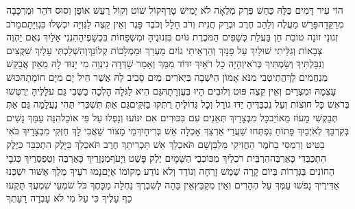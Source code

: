 \documentclass[../main/main.tex]{subfiles}
\begin{document}
\begin{multicols*}{\ncols}
הוֹי עִיר דָּמִים כֻּלָּהּ כַּחַשׁ פֶּרֶק מְלֵאָה לֹא יָמִישׁ טָרֶף\PreVerseSpace{}קוֹל שׁוֹט וְקוֹל רַעַשׁ אוֹפָן וְסוּס דֹּהֵר וּמֶרְכָּבָה מְרַקֵּדָה\PreVerseSpace{}פָּרָשׁ מַעֲלֶה וְלַהַב חֶרֶב וּבְרַק חֲנִית וְרֹב חָלָל וְכֹבֶד פָּגֶר וְאֵין קֵצֶה לַגְּוִיָּה יִכְשְׁלוּ בִּגְוִיָּתָם\PreVerseSpace{}מֵרֹב זְנוּנֵי זוֹנָה טוֹבַת חֵן בַּעֲלַת כְּשָׁפִים הַמֹּכֶרֶת גּוֹיִם בִּזְנוּנֶיהָ וּמִשְׁפָּחוֹת בִּכְשָׁפֶיהָ\PreVerseSpace{}הִנְנִי אֵלַיִךְ נְאֻם יַהְוֶה צְבָאוֹת וְגִלֵּיתִי שׁוּלַיִךְ עַל פָּנָיִךְ וְהַרְאֵיתִי גוֹיִם מַעְרֵךְ וּמַמְלָכוֹת קְלוֹנֵךְ\PreVerseSpace{}וְהִשְׁלַכְתִּי עָלַיִךְ שִׁקֻּצִים וְנִבַּלְתִּיךְ וְשַׂמְתִּיךְ כְּרֹאִי\PreVerseSpace{}וְהָיָה כָל רֹאַיִךְ יִדּוֹד מִמֵּךְ וְאָמַר שָׁדְּדָה נִינְוֵה מִי יָנוּד לָהּ מֵאַיִן אֲבַקֵּשׁ מְנַחֲמִים לָךְ\PreVerseSpace{}הֲתֵיטְבִי מִנֹּא אָמוֹן הַיֹּשְׁבָה בַּיְאֹרִים מַיִם סָבִיב לָהּ אֲשֶׁר חֵיל יָם מִיָּם חוֹמָתָהּ\PreVerseSpace{}כּוּשׁ עָצְמָהּ\SubEnd{} וּמִצְרַיִם וְאֵין קֵצֶה פּוּט וְלוּבִים הָיוּ בְּעֶזְרָתָהּ\SubEnd{}\PreVerseSpace{}גַּם הִיא לַגֹּלָה הָלְכָה בַשֶּׁבִי גַּם עֹלָלֶיהָ יְרֻטְּשׁוּ בְּרֹאשׁ כָּל חוּצוֹת וְעַל נִכְבַּדֶּיהָ יַדּוּ גוֹרָל וְכָל גְּדוֹלֶיהָ רֻתְּקוּ בַזִּקִּים\PreVerseSpace{}גַּם אַתְּ תִּשְׁכְּרִי תְּהִי נַעֲלָמָה גַּם אַתְּ תְּבַקְשִׁי מָעוֹז מֵאוֹיֵב\PreVerseSpace{}כָּל מִבְצָרַיִךְ תְּאֵנִים עִם בִּכּוּרִים אִם יִנּוֹעוּ וְנָפְלוּ עַל פִּי אוֹכֵל\PreVerseSpace{}הִנֵּה עַמֵּךְ נָשִׁים בְּקִרְבֵּךְ לְאֹיְבַיִךְ פָּתוֹחַ נִפְתְּחוּ שַׁעֲרֵי אַרְצֵךְ אָכְלָה אֵשׁ בְּרִיחָיִךְ\PreVerseSpace{}מֵי מָצוֹר שַׁאֲבִי לָךְ חַזְּקִי מִבְצָרָיִךְ בֹּאִי בַטִּיט וְרִמְסִי בַחֹמֶר הַחֲזִיקִי מַלְבֵּן\PreVerseSpace{}שָׁם תֹּאכְלֵךְ אֵשׁ תַּכְרִיתֵךְ חֶרֶב תֹּאכְלֵךְ כַּיָּלֶק הִתְכַּבֵּד כַּיֶּלֶק הִתְכַּבְּדִי כָּאַרְבֶּה\PreVerseSpace{}הִרְבֵּית רֹכְלַיִךְ מִכּוֹכְבֵי הַשָּׁמָיִם יֶלֶק פָּשַׁט וַיָּעֹף\PreVerseSpace{}מִנְּזָרַיִךְ כָּאַרְבֶּה וְטַפְסְרַיִךְ כְּגֹבָי\SubEnd{} הַחוֹנִים בַּגְּדֵרוֹת בְּיוֹם קָרָה שֶׁמֶשׁ זָרְחָה וְנוֹדַד וְלֹא נוֹדַע מְקוֹמוֹ אַיָּם\PreVerseSpace{}נָמוּ רֹעֶיךָ מֶלֶךְ אַשּׁוּר יִשְׁכְּנוּ אַדִּירֶיךָ נָפֹשׁוּ עַמְּךָ עַל הֶהָרִים וְאֵין מְקַבֵּץ\PreVerseSpace{}אֵין כֵּהָה לְשִׁבְרֶךָ נַחְלָה מַכָּתֶךָ כֹּל שֹׁמְעֵי שִׁמְעֲךָ תָּקְעוּ כַף עָלֶיךָ כִּי עַל מִי לֹא עָבְרָה רָעָתְךָ\par
\end{multicols*}
\end{document}

